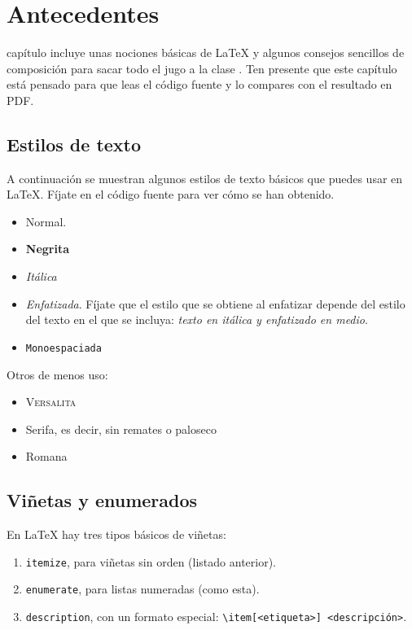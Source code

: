 \chapter{Antecedentes}
\label{chap:antecedentes}

 capítulo incluye unas nociones básicas de \LaTeX{} y algunos consejos sencillos de composición para sacar todo el jugo a la clase \gitatfg. Ten presente que este capítulo está pensado para que leas el código fuente y lo compares con el resultado en PDF.

\section{Estilos de texto}

A continuación se muestran algunos estilos de texto básicos que puedes usar en \LaTeX{}. Fíjate en el código fuente para ver cómo se han obtenido.

\begin{itemize}
  \item Normal.
  \item \textbf{Negrita}
  \item \textit{Itálica}
  \item \emph{Enfatizada}. Fíjate que el estilo que se obtiene al enfatizar depende del estilo del texto en el que se incluya: \textit{texto en itálica y \emph{enfatizado} en medio}.
  \item \texttt{Monoespaciada}
\end{itemize}

Otros de menos uso:

\begin{itemize}
  \item \textsc{Versalita}
  \item \textsf{Serifa}, es decir, sin remates o paloseco
  \item \textrm{Romana}
\end{itemize}


\section{Viñetas y enumerados}

En \LaTeX{} hay tres tipos básicos de viñetas:

\begin{enumerate}
  \item \texttt{itemize}, para viñetas sin orden (listado anterior).
  \item \texttt{enumerate}, para listas numeradas (como esta).
  \item \texttt{description}, con un formato especial: \texttt{\textbackslash item[<etiqueta>] <descripción>}.
\end{enumerate}



